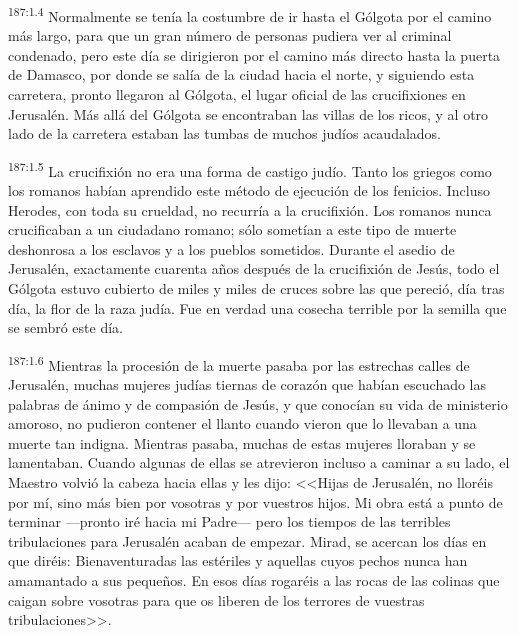 \par 
\textsuperscript{187:1.4} Normalmente se tenía la costumbre de ir hasta el Gólgota por el camino más largo, para que un gran número de personas pudiera ver al criminal condenado, pero este día se dirigieron por el camino más directo hasta la puerta de Damasco, por donde se salía de la ciudad hacia el norte, y siguiendo esta carretera, pronto llegaron al Gólgota, el lugar oficial de las crucifixiones en Jerusalén. Más allá del Gólgota se encontraban las villas de los ricos, y al otro lado de la carretera estaban las tumbas de muchos judíos acaudalados.

\par 
\textsuperscript{187:1.5} La crucifixión no era una forma de castigo judío. Tanto los griegos como los romanos habían aprendido este método de ejecución de los fenicios. Incluso Herodes, con toda su crueldad, no recurría a la crucifixión. Los romanos nunca crucificaban a un ciudadano romano; sólo sometían a este tipo de muerte deshonrosa a los esclavos y a los pueblos sometidos. Durante el asedio de Jerusalén, exactamente cuarenta años después de la crucifixión de Jesús, todo el Gólgota estuvo cubierto de miles y miles de cruces sobre las que pereció, día tras día, la flor de la raza judía. Fue en verdad una cosecha terrible por la semilla que se sembró este día.

\par 
\textsuperscript{187:1.6} Mientras la procesión de la muerte pasaba por las estrechas calles de Jerusalén, muchas mujeres judías tiernas de corazón que habían escuchado las palabras de ánimo y de compasión de Jesús, y que conocían su vida de ministerio amoroso, no pudieron contener el llanto cuando vieron que lo llevaban a una muerte tan indigna. Mientras pasaba, muchas de estas mujeres lloraban y se lamentaban. Cuando algunas de ellas se atrevieron incluso a caminar a su lado, el Maestro volvió la cabeza hacia ellas y les dijo: <<Hijas de Jerusalén, no lloréis por mí, sino más bien por vosotras y por vuestros hijos. Mi obra está a punto de terminar ---pronto iré hacia mi Padre--- pero los tiempos de las terribles tribulaciones para Jerusalén acaban de empezar. Mirad, se acercan los días en que diréis: Bienaventuradas las estériles y aquellas cuyos pechos nunca han amamantado a sus pequeños. En esos días rogaréis a las rocas de las colinas que caigan sobre vosotras para que os liberen de los terrores de vuestras tribulaciones>>.

